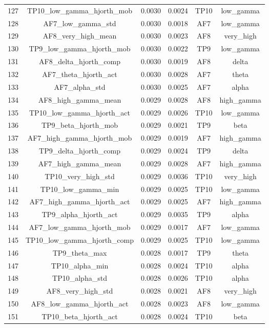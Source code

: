 \begin{table}[hptb]
\begin{table}
\begin{tabular}{cccccc}
127 & TP10_low_gamma_hjorth_mob & 0.0030 & 0.0024 & TP10 & low_gamma \\
128 & AF7_low_gamma_std & 0.0030 & 0.0018 & AF7 & low_gamma \\
129 & AF8_very_high_mean & 0.0030 & 0.0023 & AF8 & very_high \\
130 & TP9_low_gamma_hjorth_mob & 0.0030 & 0.0022 & TP9 & low_gamma \\
131 & AF8_delta_hjorth_comp & 0.0030 & 0.0019 & AF8 & delta \\
132 & AF7_theta_hjorth_act & 0.0030 & 0.0028 & AF7 & theta \\
133 & AF7_alpha_std & 0.0030 & 0.0025 & AF7 & alpha \\
134 & AF8_high_gamma_mean & 0.0029 & 0.0028 & AF8 & high_gamma \\
135 & TP10_low_gamma_hjorth_act & 0.0029 & 0.0026 & TP10 & low_gamma \\
136 & TP9_beta_hjorth_mob & 0.0029 & 0.0021 & TP9 & beta \\
137 & AF7_high_gamma_hjorth_mob & 0.0029 & 0.0019 & AF7 & high_gamma \\
138 & TP9_delta_hjorth_comp & 0.0029 & 0.0024 & TP9 & delta \\
139 & AF7_high_gamma_mean & 0.0029 & 0.0028 & AF7 & high_gamma \\
140 & TP10_very_high_std & 0.0029 & 0.0036 & TP10 & very_high \\
141 & TP10_low_gamma_min & 0.0029 & 0.0025 & TP10 & low_gamma \\
142 & AF7_high_gamma_hjorth_act & 0.0029 & 0.0025 & AF7 & high_gamma \\
143 & TP9_alpha_hjorth_act & 0.0029 & 0.0035 & TP9 & alpha \\
144 & AF7_low_gamma_hjorth_mob & 0.0029 & 0.0017 & AF7 & low_gamma \\
145 & TP10_low_gamma_hjorth_comp & 0.0029 & 0.0025 & TP10 & low_gamma \\
146 & TP9_theta_max & 0.0028 & 0.0017 & TP9 & theta \\
147 & TP10_alpha_min & 0.0028 & 0.0024 & TP10 & alpha \\
148 & TP10_alpha_std & 0.0028 & 0.0026 & TP10 & alpha \\
149 & AF8_very_high_std & 0.0028 & 0.0021 & AF8 & very_high \\
150 & AF8_low_gamma_hjorth_act & 0.0028 & 0.0023 & AF8 & low_gamma \\
151 & TP10_beta_hjorth_act & 0.0028 & 0.0024 & TP10 & beta \\

\end{tabular}
\end{table}
\end{table}

